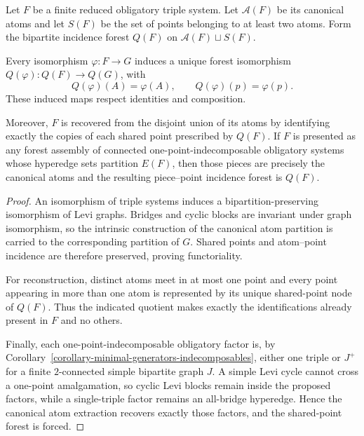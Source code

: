 
\begin{proposition}
\label{proposition-functorial-canonical-atom-forest}
Let $F$ be a finite reduced obligatory triple system.  Let $\mathcal A(F)$
be its canonical atoms and let $S(F)$ be the set of points belonging to at
least two atoms.  Form the bipartite incidence forest $Q(F)$ on
$\mathcal A(F)\sqcup S(F)$.

Every isomorphism $\varphi:F\to G$ induces a unique forest isomorphism
$Q(\varphi):Q(F)\to Q(G)$, with
\[
Q(\varphi)(A)=\varphi(A),\qquad Q(\varphi)(p)=\varphi(p).
\]
These induced maps respect identities and composition.

Moreover, $F$ is recovered from the disjoint union of its atoms by identifying
exactly the copies of each shared point prescribed by $Q(F)$.  If $F$ is
presented as any forest assembly of connected one-point-indecomposable
obligatory systems whose hyperedge sets partition $E(F)$, then those pieces
are precisely the canonical atoms and the resulting piece--point incidence
forest is $Q(F)$.
\end{proposition}

\begin{proof}
An isomorphism of triple systems induces a bipartition-preserving isomorphism
of Levi graphs.  Bridges and cyclic blocks are invariant under graph
isomorphism, so the intrinsic construction of the canonical atom partition is
carried to the corresponding partition of $G$.  Shared points and atom--point
incidence are therefore preserved, proving functoriality.

For reconstruction, distinct atoms meet in at most one point and every point
appearing in more than one atom is represented by its unique shared-point node
of $Q(F)$.  Thus the indicated quotient makes exactly the identifications
already present in $F$ and no others.

Finally, each one-point-indecomposable obligatory factor is, by
Corollary~\ref{corollary-minimal-generators-indecomposables}, either one triple
or $J^+$ for a finite $2$-connected simple bipartite graph $J$.  A simple Levi
cycle cannot cross a one-point amalgamation, so cyclic Levi blocks remain
inside the proposed factors, while a single-triple factor remains an
all-bridge hyperedge.  Hence the canonical atom extraction recovers exactly
those factors, and the shared-point forest is forced.
\end{proof}

